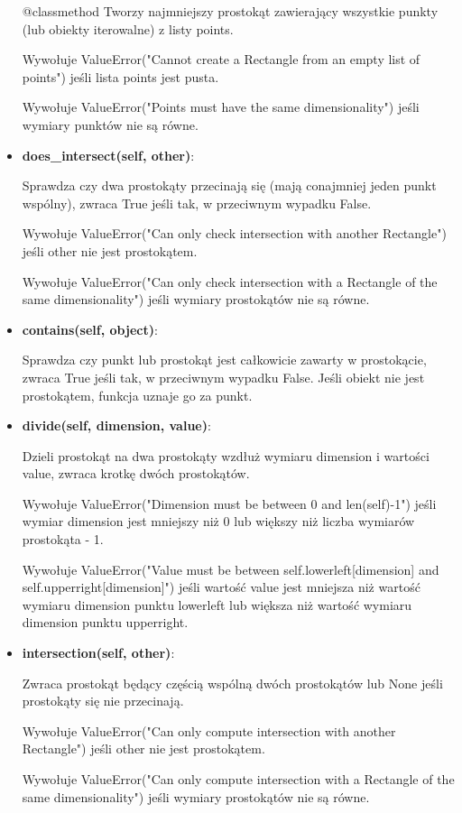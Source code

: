 \documentclass{lab}
\begin{document}
\begin{itemize}
  @classmethod Tworzy najmniejszy prostokąt zawierający wszystkie punkty (lub obiekty iterowalne) z listy points.

  Wywołuje ValueError("Cannot create a Rectangle from an empty list of points") jeśli lista points jest pusta.

  Wywołuje ValueError("Points must have the same dimensionality") jeśli wymiary punktów nie są równe.

  \item \textbf{does\_intersect(self, other)}:
  
  Sprawdza czy dwa prostokąty przecinają się (mają conajmniej jeden punkt wspólny), zwraca True jeśli tak, w przeciwnym wypadku False.

  Wywołuje ValueError("Can only check intersection with another Rectangle") jeśli other nie jest prostokątem.

  Wywołuje ValueError("Can only check intersection with a Rectangle of the same dimensionality") jeśli wymiary prostokątów nie są równe.

  \item \textbf{contains(self, object)}:
  
  Sprawdza czy punkt lub prostokąt jest całkowicie zawarty w prostokącie, zwraca True jeśli tak, w przeciwnym wypadku False. Jeśli obiekt nie jest prostokątem, funkcja uznaje go za punkt.

  \item \textbf{divide(self, dimension, value)}:
  
  Dzieli prostokąt na dwa prostokąty wzdłuż wymiaru dimension i wartości value, zwraca krotkę dwóch prostokątów.

  Wywołuje ValueError("Dimension must be between 0 and {len(self)-1}") jeśli wymiar dimension jest mniejszy niż 0 lub większy niż liczba wymiarów prostokąta - 1.

  Wywołuje ValueError("Value must be between {self.lowerleft[dimension]} and {self.upperright[dimension]}") jeśli wartość value jest mniejsza niż wartość wymiaru dimension punktu lowerleft lub większa niż wartość wymiaru dimension punktu upperright.

  \item \textbf{intersection(self, other)}:
  
  Zwraca prostokąt będący częścią wspólną dwóch prostokątów lub None jeśli prostokąty się nie przecinają.

  Wywołuje ValueError("Can only compute intersection with another Rectangle") jeśli other nie jest prostokątem.

  Wywołuje ValueError("Can only compute intersection with a Rectangle of the same dimensionality") jeśli wymiary prostokątów nie są równe.
\end{itemize}
\end{document}
